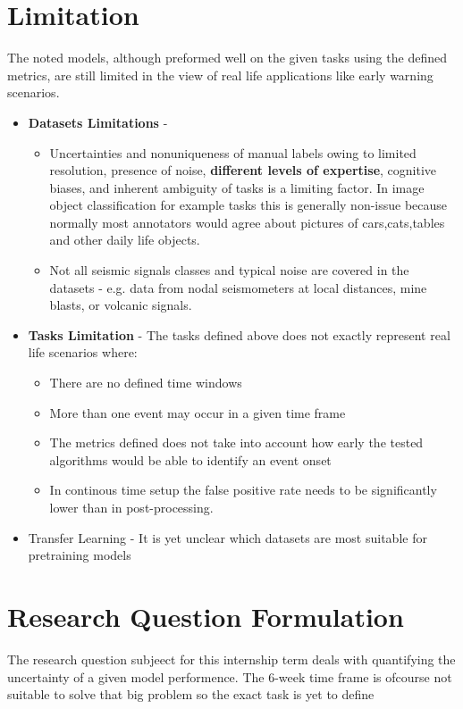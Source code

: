 \documentclass[11pt,a4paper]{article}
\begin{document}
\section{Limitation}

The noted models, although preformed well on the given tasks using the defined metrics, are still limited in the view of real life applications like early warning scenarios.

\begin{itemize}
\item \textbf{Datasets Limitations}  -
\begin{itemize}
\item Uncertainties and nonuniqueness of manual labels owing to limited resolution, presence of noise, \textbf{different levels of expertise}, cognitive biases, and inherent ambiguity of
tasks is a limiting factor. In image object classification for example tasks this is generally non-issue because normally most annotators would agree about pictures of cars,cats,tables and other daily life objects.
\item Not all seismic signals classes and typical noise are covered in the datasets - e.g. data from nodal seismometers at local distances, mine blasts, or volcanic signals.
\end{itemize}

 
\item \textbf{Tasks Limitation} - The tasks defined above does not exactly represent real life scenarios where:
\begin{itemize}
\item There are no defined time windows
\item More than one event may occur in a given time frame
\item The metrics defined does not take into account how early the tested algorithms would be able to identify an event onset
\item In continous time setup the false positive rate needs to be significantly lower than in post-processing.

\end{itemize}

\item Transfer Learning - It is yet unclear which datasets are most suitable for pretraining models

\end{itemize}


\section{Research Question Formulation}
The research question subjeect for this internship term deals with quantifying the uncertainty of a given model performence.
The 6-week time frame is ofcourse not suitable to solve that big problem so the exact task is yet to define
\end{document}
